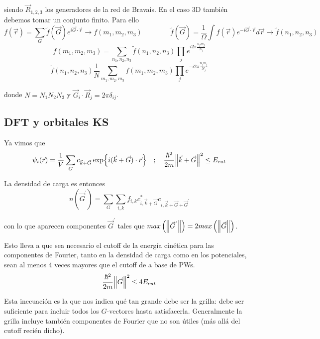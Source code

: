   siendo $\vec{R}_{1,2,3}$ los generadores de la red de Bravais. En el caso 3D también debemos tomar un conjunto finito. Para ello
    $$f(\vec{r}) = \sum_G \tilde{f} (\vec{G}) e^{i \vec{G}\cdot\vec{r}} \rightarrow f(m_1, m_2, m_3)
    \quad\quad\quad\quad
    \tilde{f}(\vec{G}) = \frac{1}{\Omega} \int f (\vec{r}) e^{-i \vec{G}\cdot\vec{r}} d \vec{r} \rightarrow \tilde{f}(n_1, n_2, n_3)$$
    $$f(m_1, m_2, m_3) = \sum_{n_1, n_2, n_3} \tilde{f} (n_1, n_2, n_3) \prod_j e^{i 2 \pi \frac{n_j m_j}{N_j}}$$
    $$\tilde{f}(n_1, n_2, n_3) \frac{1}{N} \sum_{m_1, m_2, m_3} f (m_1, m_2, m_3) \prod_j e^{-i 2 \pi \frac{n_j m_j}{N_j}}$$

  donde $N = N_1 N_2 N_3$ y $\vec{G}_i \cdot \vec{R}_j = 2\pi\delta_{ij}$.

\subsection{DFT y orbitales KS}

  Ya vimos que
    $$\psi_i (\vec{r}) = \frac{1}{V} \sum_G c_{\vec{k} + \vec{G}} \exp{i (\vec{k} + \vec{G}) \cdot \vec{r}}
    \quad ; \quad
    \frac{\hbar^2}{2m} \norm{\vec{k} + \vec{G}}^2 \leq E_{cut}$$

  La densidad de carga es entonces
    $$n (\vec{G}^{'}) = \sum_G \sum_{i,k} f_{i,k} c_{i,\vec{k} + \vec{G}}^{*} c_{i,\vec{k} + \vec{G} + \vec{G}^{'}}$$

  con lo que aparecen componentes $\vec{G}^{'}$ tales que $max\left(\norm{\vec{G}^{'}}\right) = 2 max\left(\norm{\vec{G}}\right)$.

  Esto lleva a que sea necesario el cutoff de la energía cinética para las componentes de Fourier, tanto en la densidad de carga como en los potenciales, sean al menos 4 veces mayores que el cutoff de a base de PWs.
    $$\frac{\hbar^2}{2m} \norm{\vec{G}}^2 \leq 4 E_{cut}$$

  Esta inecuación es la que nos indica qué tan grande debe ser la grilla: debe ser suficiente para incluir todos los $G$-vectores hasta satisfacerla. Generalmente la grilla incluye también componentes de Fourier que no son útiles (más allá del cutoff recién dicho).

